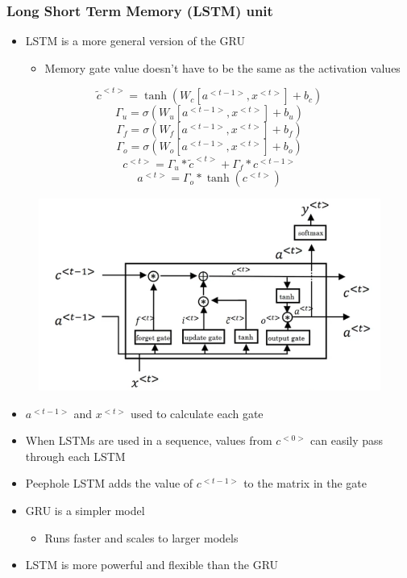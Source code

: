 \documentclass[12pt, letterpaper]{article}
\begin{document}
    \subsubsection{Long Short Term Memory (LSTM) unit}
    \begin{itemize}
        \item LSTM is a more general version of the GRU
        \begin{itemize}
            \item Memory gate value doesn't have to be the same as the activation values
        \end{itemize}
    \end{itemize}
    $$\tilde{c}^{<t>}=\tanh(W_c[a^{<t-1>},x^{<t>}]+b_c)$$  
    $$\Gamma_u=\sigma(W_u[a^{<t-1>},x^{<t>}]+b_u)$$
    $$\Gamma_f=\sigma(W_f[a^{<t-1>},x^{<t>}]+b_f)$$ 
    $$\Gamma_o=\sigma(W_o[a^{<t-1>},x^{<t>}]+b_o)$$
    $$c^{<t>}=\Gamma_u*\tilde{c}^{<t>}+\Gamma_f*c^{<t-1>}$$ 
    $$a^{<t>}=\Gamma_o*\tanh(c^{<t>})$$
    \begin{figure}[ht]
        \centering 
        \includegraphics[width=12cm]{34.png}
    \end{figure}
    \begin{itemize}
        \item $a^{<t-1>}$ and $x^{<t>}$ used to calculate each gate
        \item When LSTMs are used in a sequence, values from $c^{<0>}$ can easily pass through each LSTM
        \item Peephole LSTM adds the value of $c^{<t-1>}$ to the matrix in the gate
        \item GRU is a simpler model
        \begin{itemize}
            \item Runs faster and scales to larger models
        \end{itemize}
        \item LSTM is more powerful and flexible than the GRU
    \end{itemize}
\end{document}

